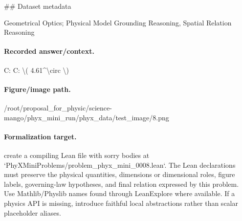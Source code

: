 \#\# Dataset metadata

Geometrical Optics; Physical Model Grounding Reasoning, Spatial Relation Reasoning

\paragraph{Recorded answer/context.}
C: C: \textbackslash{}( 4.61\textasciicircum{}\textbackslash{}circ \textbackslash{})

\paragraph{Figure/image path.}
/root/proposal\_for\_physic/science-mango/phyx\_mini\_run/phyx\_data/test\_image/8.png

\paragraph{Formalization target.}
create a compiling Lean file with sorry bodies at `PhyXMiniProblems/problem\_phyx\_mini\_0008.lean`. The Lean declarations must preserve the physical quantities, dimensions or dimensional roles, figure labels, governing-law hypotheses, and final relation expressed by this problem.
Use Mathlib/Physlib names found through LeanExplore where available. If a physics API is missing, introduce faithful local abstractions rather than scalar placeholder aliases.

